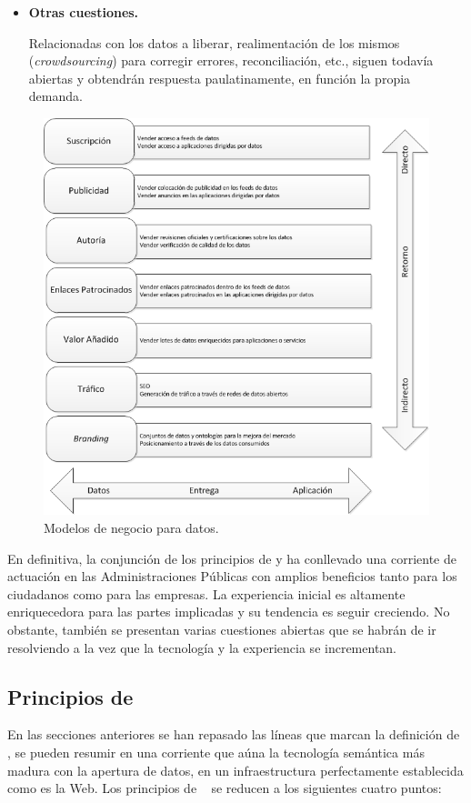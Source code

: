 \begin{itemize}
\item \textbf{Otras cuestiones.}

Relacionadas con los datos a liberar, realimentación de los mismos (\textit{crowdsourcing}) para corregir errores, 
reconciliación, etc., siguen todavía abiertas y obtendrán respuesta paulatinamente, en función la propia demanda.
\end{itemize}

\begin{figure}[!htb]
\centering
	\includegraphics[width=12cm]{images/phd/data-business-models}
\caption{Modelos de negocio para datos.}
\label{fig:data-business-model}
\end{figure}


En definitiva, la conjunción de los principios de \linkeddata y \opendata ha conllevado una corriente de actuación
en las Administraciones Públicas con amplios beneficios tanto para los ciudadanos como para las empresas. La experiencia inicial es altamente
enriquecedora para las partes implicadas y su tendencia es seguir creciendo. No obstante, también se presentan varias cuestiones
abiertas que se habrán de ir resolviendo a la vez que la tecnología y la experiencia se incrementan.
\subsection{Principios de \linkeddata}\label{principos-linked-data}
En las secciones anteriores se han repasado las líneas que marcan la definición de \linkeddata, se pueden resumir
en una corriente que aúna la tecnología semántica más madura con la apertura de datos, en un infraestructura perfectamente
establecida como es la Web. Los principios de \linkeddata~\cite{Berners-Lee-2006} se reducen a los siguientes cuatro puntos:

